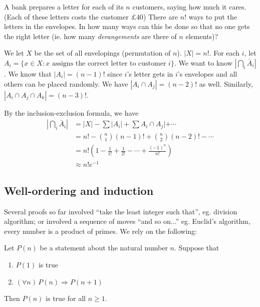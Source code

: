 \documentclass[a4paper]{article}
\begin{document}
\begin{eg}
  A bank prepares a letter for each of its $n$ customers, saying how much it cares. (Each of these letters costs the customer $\pounds 40$) There are $n!$ ways to put the letters in the envelopes. In how many ways can this be done so that no one gets the right letter (ie. how many \emph{derangements} are there of $n$ elements)?

  We let $X$ be the set of all envelopings (permutation of $n$). $|X| = n!$. For each $i$, let $A_i = \{x\in X: x \text{ assigns the correct letter to customer }i\}$. We want to know $|\bigcap_i \bar A_i|$. We know that $|A_i| = (n - 1)!$ since $i$'s letter gets in $i$'s envelopes and all others can be placed randomly. We have $|A_i\cap A_j| = (n - 2)!$ as well. Similarly, $|A_i\cap A_j \cap A_k| = (n - 3)!$.

  By the inclusion-exclusion formula, we have
  \begin{align*}
    \left|\bigcap_i \bar A_i\right| &= |X| - \sum |A_i| + \sum A_i\cap A_j| + \cdots\\
    &= n! - \binom{n}{1}(n - 1)! + \binom{n}{2}(n - 2)! - \cdots\\
    &= n!\left(1 - \frac{1}{1!} + \frac{1}{2!} - \cdots + \frac{(-1)^n}{n!}\right)\\
    &\approx n! e^{-1}
  \end{align*}
\end{eg}
\subsection{Well-ordering and induction}
Several proofs so far involved ``take the least integer such that'', eg. division algorithm; or involved a sequence of moves ``and so on...'' eg. Euclid's algorithm, every number is a product of primes. We rely on the following:
\begin{thm}
  Let $P(n)$ be a statement about the natural number $n$. Suppose that
  \begin{enumerate}
    \item $P(1)$ is true
    \item $(\forall n)\,P(n)\Rightarrow P(n + 1)$
  \end{enumerate}
  Then $P(n)$ is true for all $n\geq 1$.
\end{thm}
\end{document}
